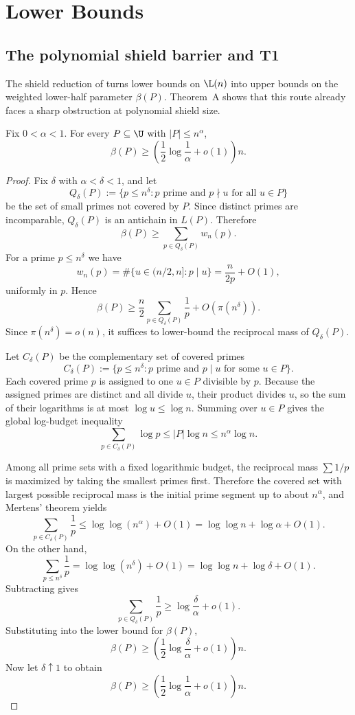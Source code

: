 \section{Lower Bounds}\label{sec:lower-bounds}

\subsection{The polynomial shield barrier and T1}

The shield reduction of  turns lower bounds on
$\L(n)$ into upper bounds on the weighted lower-half parameter $\beta(P)$.
Theorem~A shows that this route already faces a sharp obstruction at polynomial
shield size.

\begin{theorem}[Theorem A]\label{thm:theorem-a}
Fix $0<\alpha<1$.  For every $P \subseteq \U$ with $|P| \le n^\alpha$,
\[
  \beta(P) \ge \left(\frac12 \log\frac1\alpha + o(1)\right)n.
\]
\end{theorem}

\begin{proof}
Fix $\delta$ with $\alpha<\delta<1$, and let
\[
  Q_\delta(P)
  :=
  \{p \le n^\delta : p \text{ prime and } p \nmid u \text{ for all } u \in P\}
\]
be the set of small primes not covered by $P$.  Since distinct primes are
incomparable, $Q_\delta(P)$ is an antichain in $L(P)$.  Therefore
\[
  \beta(P) \ge \sum_{p \in Q_\delta(P)} w_n(p).
\]
For a prime $p \le n^\delta$ we have
\[
  w_n(p)=\#\{u \in (n/2,n] : p \mid u\}
  = \frac{n}{2p}+O(1),
\]
uniformly in $p$.  Hence
\[
  \beta(P)
  \ge
  \frac n2 \sum_{p \in Q_\delta(P)} \frac1p + O(\pi(n^\delta)).
\]
Since $\pi(n^\delta)=o(n)$, it suffices to lower-bound the reciprocal mass of
$Q_\delta(P)$.

Let $C_\delta(P)$ be the complementary set of covered primes
\[
  C_\delta(P)
  :=
  \{p \le n^\delta : p \text{ prime and } p \mid u \text{ for some } u \in P\}.
\]
Each covered prime $p$ is assigned to one $u \in P$ divisible by $p$.  Because
the assigned primes are distinct and all divide $u$, their product divides $u$,
so the sum of their logarithms is at most $\log u \le \log n$.  Summing over
$u \in P$ gives the global log-budget inequality
\[
  \sum_{p \in C_\delta(P)} \log p \le |P| \log n \le n^\alpha \log n.
\]

Among all prime sets with a fixed logarithmic budget, the reciprocal mass
$\sum 1/p$ is maximized by taking the smallest primes first.  Therefore the
covered set with largest possible reciprocal mass is the initial prime segment
up to about $n^\alpha$, and Mertens' theorem yields
\[
  \sum_{p \in C_\delta(P)} \frac1p \le \log\log(n^\alpha) + O(1)
  = \log\log n + \log \alpha + O(1).
\]
On the other hand,
\[
  \sum_{p \le n^\delta} \frac1p = \log\log(n^\delta)+O(1)
  = \log\log n + \log\delta + O(1).
\]
Subtracting gives
\[
  \sum_{p \in Q_\delta(P)} \frac1p
  \ge \log\frac{\delta}{\alpha} + o(1).
\]
Substituting into the lower bound for $\beta(P)$,
\[
  \beta(P) \ge \left(\frac12 \log\frac{\delta}{\alpha}+o(1)\right)n.
\]
Now let $\delta \uparrow 1$ to obtain
\[
  \beta(P) \ge \left(\frac12 \log\frac1\alpha+o(1)\right)n.
\]
\end{proof}

